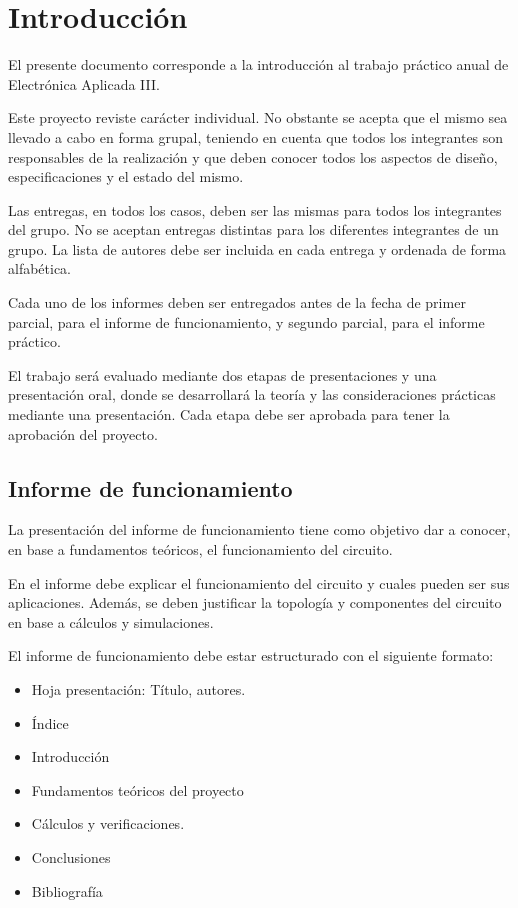\section{Introducción}

El presente documento corresponde a la introducción al trabajo práctico anual de Electrónica Aplicada III.   


Este proyecto reviste carácter individual. 
No obstante se acepta que el mismo sea llevado a cabo en forma grupal, teniendo en cuenta que todos los integrantes son responsables de la realización y que deben conocer todos los aspectos de diseño, especificaciones y el estado del mismo. 

Las entregas, en todos los casos, deben ser las mismas para todos los integrantes del grupo. 
No se aceptan entregas distintas para los diferentes integrantes de un grupo. 
La lista de autores debe ser incluida en cada entrega y ordenada de forma alfabética. 

Cada uno de los informes deben ser entregados antes de la fecha de primer parcial, para el informe de funcionamiento, y segundo parcial, para el informe práctico.  

El trabajo será evaluado mediante dos etapas de presentaciones y una presentación oral, donde se desarrollará la teoría y las consideraciones prácticas mediante una presentación. 
Cada etapa debe ser aprobada para tener la aprobación del proyecto. 


\subsection{Informe de funcionamiento}

La presentación del informe de funcionamiento tiene como objetivo 
dar a conocer, en base a fundamentos teóricos, el funcionamiento del circuito. 

En el informe debe explicar el funcionamiento del circuito y cuales pueden ser sus aplicaciones. Además, se deben justificar la topología y componentes del circuito en base a cálculos y simulaciones. 


El informe de funcionamiento debe estar estructurado con el siguiente formato:

\begin{itemize}
    \item Hoja presentación: Título, autores.
    \item Índice
    \item Introducción
    \item Fundamentos teóricos del proyecto
    \item Cálculos y verificaciones.
    \item Conclusiones
    \item Bibliografía
\end{itemize}


